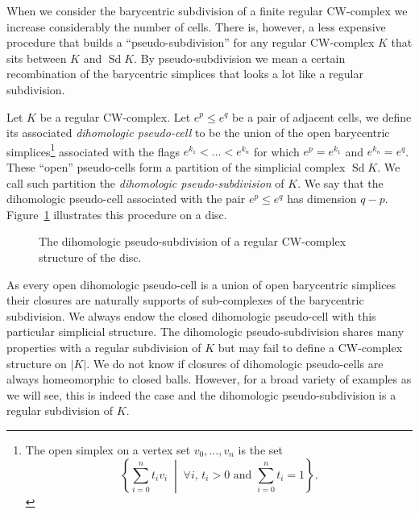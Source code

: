 \documentclass[AHL,Unicode,longabstracts,published]{cedram}
\DeclareMathOperator{\Sd}{Sd}
\let\oldforall\forall
\renewcommand*{\forall}{\mathrel{\oldforall}}
\begin{document}
When we consider the barycentric subdivision of a finite regular CW-complex we increase considerably the number of cells. There is, however, a less expensive procedure that builds a ``pseudo-subdivision'' for any regular CW-complex $K$ that sits between $K$ and $\Sd K$. By pseudo-subdivision we mean a certain recombination of the barycentric simplices that looks a lot like a regular subdivision.

\begin{defi}
Let $K$ be a regular CW-complex. Let $e^p\leq e^q$ be a pair of adjacent cells, we define its associated \emph{dihomologic pseudo-cell} to be the union of the open barycentric simplices\footnote{The open simplex on a vertex set $v_0,\dots,v_n$ is the set
\[
\left\{\sum_{i=0}^nt_iv_i\;\middle|\; \forall i,\,t_i>0\text{ and }\sum_{i=0}^nt_i=1\right\}.
\]
} associated with the flags $e^{k_1}<\dots<e^{k_n}$ for which $e^p= e^{k_1}$ and $e^{k_n}=e^q$. These ``open'' pseudo-cells form a partition of the simplicial complex $\Sd K$. We call such partition the \emph{dihomologic pseudo-subdivision} of $K$. We say that the dihomologic pseudo-cell associated with the pair $e^p\leq e^q$ has dimension $q-p$. Figure~\ref{fig:dih_sub_disc} illustrates this procedure on a disc.
\end{defi}

\begin{figure}[h]
\centering
{}
\caption{The dihomologic pseudo-subdivision of a regular CW-complex structure of the disc.}\label{fig:dih_sub_disc}
\end{figure}

As every open dihomologic pseudo-cell is a union of open barycentric simplices their closures are naturally supports of sub-complexes of the barycentric subdivision. We always endow the closed dihomologic pseudo-cell with this particular simplicial structure. The dihomologic pseudo-subdivision shares many properties with a regular subdivision of $K$ but may fail to define a CW-complex structure on $|K|$. We do not know if closures of dihomologic pseudo-cells are always homeomorphic to closed balls. However, for a broad variety of examples as we will see, this is indeed the case and the dihomologic pseudo-subdivision is a regular subdivision of $K$.
\end{document}
